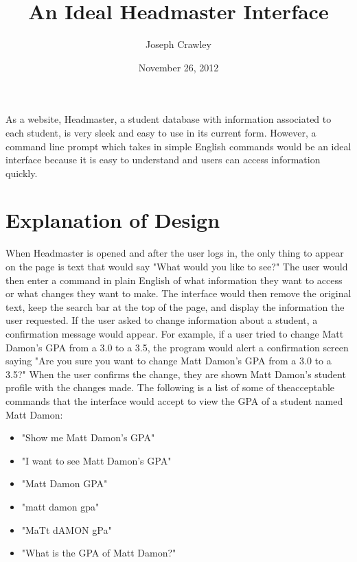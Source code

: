 \documentclass{article}
\title{An Ideal Headmaster Interface}
\author{Joseph Crawley}
\date{November 26, 2012}
\begin{document}
\maketitle

\abstract{}
As a website, Headmaster, a student database with information associated to each student, is very sleek and easy to use in its current form. However, a command line prompt which takes in simple English commands would be an ideal interface because it is easy to understand and users can access information quickly.

\pagebreak
\tableofcontents





\pagebreak

%
%
\section{Explanation of Design}
\label{introduction}

When Headmaster is opened and after the user logs in, the only thing to appear on the page is text that would say "What would you like to see?" The user would then enter a command in plain English of what information they want to access or what changes they want to make. The interface would then remove the original text, keep the search bar at the top of the page, and display the information the user requested. If the user asked to change information about a student, a confirmation message would appear. For example, if a user tried to change Matt Damon's GPA from a 3.0 to a 3.5, the program would alert a confirmation screen saying "Are you sure you want to change Matt Damon's GPA from a 3.0 to a 3.5?" When the user confirms the change, they are shown Matt Damon's student profile with the changes made. The following is a list of some of theacceptable commands that the interface would accept to view the GPA of a student named Matt Damon:
\begin{itemize}
\item "Show me Matt Damon's GPA"
\item "I want to see Matt Damon's GPA"
\item "Matt Damon GPA"
\item "matt damon gpa"
\item "MaTt dAMON gPa"
\item "What is the GPA of Matt Damon?"
\end{itemize}
\end{document}
